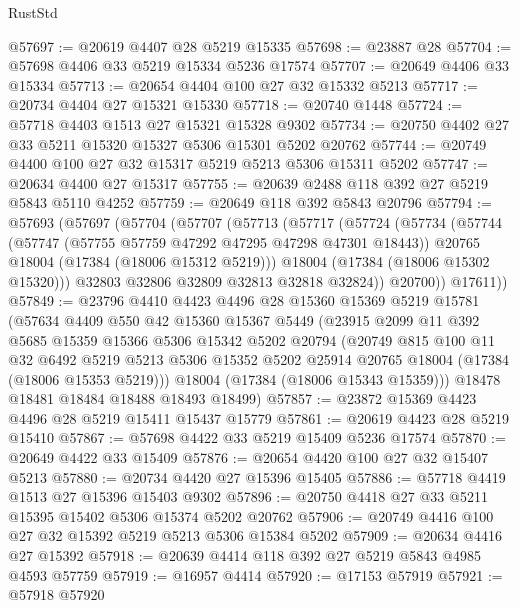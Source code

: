 \begin{lexlean}{RustStd}
\begin{coremodule}
@57697 := @20619 @4407 @28 @5219 @15335
@57698 := @23887 @28
@57704 := @57698 @4406 @33 @5219 @15334 @5236 @17574
@57707 := @20649 @4406 @33 @15334
@57713 := @20654 @4404 @100 @27 @32 @15332 @5213
@57717 := @20734 @4404 @27 @15321 @15330
@57718 := @20740 @1448
@57724 := @57718 @4403 @1513 @27 @15321 @15328 @9302
@57734 := @20750 @4402 @27 @33 @5211 @15320 @15327 @5306 @15301 @5202 @20762
@57744 := @20749 @4400 @100 @27 @32 @15317 @5219 @5213 @5306 @15311 @5202
@57747 := @20634 @4400 @27 @15317
@57755 := @20639 @2488 @118 @392 @27 @5219 @5843 @5110 @4252
@57759 := @20649 @118 @392 @5843 @20796
@57794 := @57693
    (@57697
      (@57704
        (@57707
          (@57713
            (@57717
              (@57724
                (@57734
                  (@57744
                    (@57747 (@57755 @57759 @47292 @47295 @47298 @47301 @18443))
                    @20765
                    @18004
                    (@17384 (@18006 @15312 @5219)))
                  @18004
                  (@17384 (@18006 @15302 @15320)))
                @32803
                @32806
                @32809
                @32813
                @32818
                @32824))
            @20700))
        @17611))
@57849 := @23796
    @4410
    @4423
    @4496
    @28
    @15360
    @15369
    @5219
    @15781
    (@57634
      @4409
      @550
      @42
      @15360
      @15367
      @5449
      (@23915
        @2099
        @11
        @392
        @5685
        @15359
        @15366
        @5306
        @15342
        @5202
        @20794
        (@20749
          @815
          @100
          @11
          @32
          @6492
          @5219
          @5213
          @5306
          @15352
          @5202
          @25914
          @20765
          @18004
          (@17384 (@18006 @15353 @5219)))
        @18004
        (@17384 (@18006 @15343 @15359)))
      @18478
      @18481
      @18484
      @18488
      @18493
      @18499)
@57857 := @23872 @15369 @4423 @4496 @28 @5219 @15411 @15437 @15779
@57861 := @20619 @4423 @28 @5219 @15410
@57867 := @57698 @4422 @33 @5219 @15409 @5236 @17574
@57870 := @20649 @4422 @33 @15409
@57876 := @20654 @4420 @100 @27 @32 @15407 @5213
@57880 := @20734 @4420 @27 @15396 @15405
@57886 := @57718 @4419 @1513 @27 @15396 @15403 @9302
@57896 := @20750 @4418 @27 @33 @5211 @15395 @15402 @5306 @15374 @5202 @20762
@57906 := @20749 @4416 @100 @27 @32 @15392 @5219 @5213 @5306 @15384 @5202
@57909 := @20634 @4416 @27 @15392
@57918 := @20639 @4414 @118 @392 @27 @5219 @5843 @4985 @4593 @57759
@57919 := @16957 @4414
@57920 := @17153 @57919
@57921 := @57918 @57920

\end{coremodule}
\end{lexlean}
